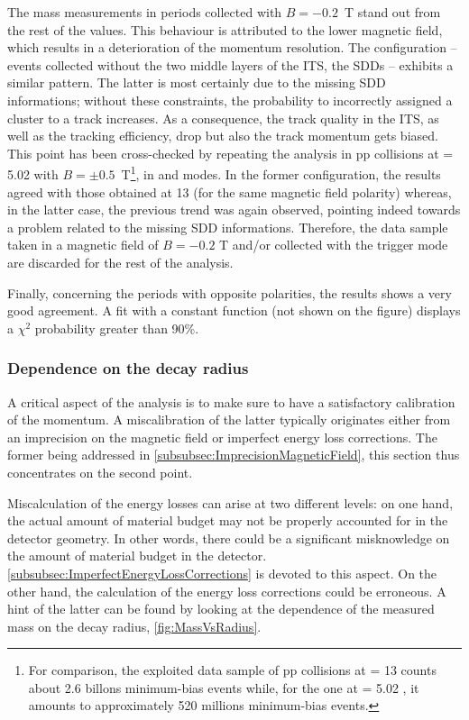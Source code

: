 The mass measurements in periods collected with $B =-0.2$~T stand out from the rest of the values. This behaviour is attributed to the lower magnetic field, which results in a deterioration of the momentum resolution. The  configuration -- \ie events collected without the two middle layers of the ITS, the SDDs -- exhibits a similar pattern. The latter is most certainly due to the missing SDD informations; without these constraints, the probability to incorrectly assigned a cluster to a track increases. As a consequence, the track quality in the ITS, as well as the tracking efficiency, drop but also the track momentum gets biased. This point has been cross-checked by repeating the analysis in pp collisions at \sqrtS = 5.02 \tev with $B = \pm 0.5$~T\footnote{For comparison, the exploited data sample of pp collisions at \sqrtS = 13 \tev counts about 2.6 billons minimum-bias events while, for the one at \sqrtS = 5.02 \tev, it amounts to approximately 520 millions minimum-bias events.}, in  and  modes. In the former configuration, the results agreed with those obtained at 13 \tev (for the same magnetic field polarity) whereas, in the latter case, the previous trend was again observed, pointing indeed towards a problem related to the missing SDD informations. Therefore, the data sample taken in a magnetic field of $B = -0.2$ T and/or collected with the  trigger mode are discarded for the rest of the analysis.

Finally, concerning the periods with opposite polarities, the results shows a very good agreement. A fit with a constant function (not shown on the figure) displays a $\chi^2$ probability greater than 90\%.

\subsubsection{Dependence on the decay radius}
\label{subsubsec:DecayRadiusDependence}

A critical aspect of the analysis is to make sure to have a satisfactory calibration of the momentum. A miscalibration of the latter typically originates either from an imprecision on the magnetic field or imperfect energy loss corrections. The former being addressed in \Sec\ref{subsubsec:ImprecisionMagneticField}, this section thus concentrates on the second point.

Miscalculation of the energy losses can arise at two different levels: on one hand, the actual amount of material budget may not be properly accounted for in the detector geometry. In other words, there could be a significant misknowledge on the amount of material budget in the detector. \Sec\ref{subsubsec:ImperfectEnergyLossCorrections} is devoted to this aspect. On the other hand, the calculation of the energy loss corrections could be erroneous. A hint of the latter can be found by looking at the dependence of the measured mass on the decay radius, \fig\ref{fig:MassVsRadius}.\\

